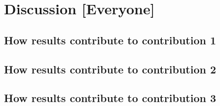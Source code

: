 \section{Discussion [Everyone]}
\subsection{How results contribute to contribution 1}
\subsection{How results contribute to contribution 2}
\subsection{How results contribute to contribution 3}
